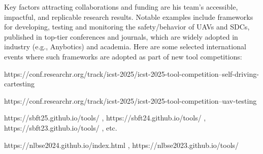 \documentclass[11pt]{article}
\begin{document}
Key factors attracting collaborations and funding are his team's accessible, impactful, and replicable research results. Notable examples include frameworks for developing, testing and monitoring the safety/behavior of UAVs and SDCs, published in top-tier conferences and journals, which are 
widely adopted in industry (e.g., Anybotics) and academia.  Here are some selected international events where such frameworks are adopted as part of new tool competitions: 
\begin{itemize}
{\fontsize{11}{11.5}\selectfont 
\vspace{-2.5mm}
	\item https://conf.researchr.org/track/icst-2025/icst-2025-tool-competition--self-driving-cartesting
    \vspace{-2.5mm}
	\item https://conf.researchr.org/track/icst-2025/icst-2025-tool-competition--uav-testing
    \vspace{-2.5mm}
	\item https://sbft25.github.io/tools/ ,  https://sbft24.github.io/tools/ , https://sbft23.github.io/tools/ , etc. %
    \vspace{-3mm}
	\item https://nlbse2024.github.io/index.html , https://nlbse2023.github.io/tools/ 
    }
\end{itemize}
\end{document}
